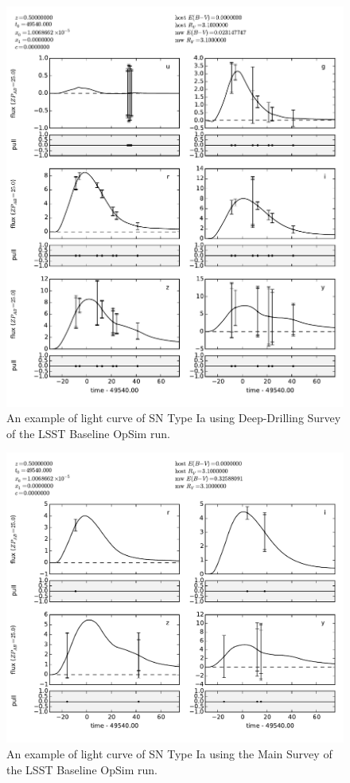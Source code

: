 \begin{figure}[tbh!]
\includegraphics[angle=0,width=0.99\hsize:,clip]{figs/SN_290_lc.pdf}
\caption{An example of light curve of SN Type Ia using Deep-Drilling Survey of the LSST Baseline OpSim run.
}
\label{fig:SNIaLCopsimdeep}
\end{figure}



\begin{figure}[tbh!]
\includegraphics[angle=0,width=0.99\hsize:,clip]{figs/SN_309_lc.pdf}
\caption{An example of light curve of SN Type Ia using the Main Survey of the LSST Baseline OpSim
run.
}
\label{fig:SNIaLCopsimmain}
\end{figure}

